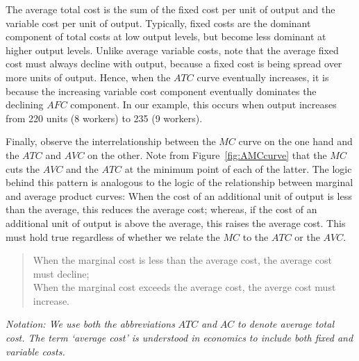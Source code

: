 \newhtmlpage

The average total cost is the sum of the fixed cost per unit of output and
the variable cost per unit of output. Typically, fixed costs are the
dominant component of total costs at low output levels, but become less
dominant at higher output levels. Unlike average variable costs, note that
the average fixed cost must always decline with output, because a fixed cost
is being spread over more units of output. Hence, when the $ATC$ curve
eventually increases, it is because the increasing variable cost component
eventually dominates the declining $AFC$ component. In our example, this
occurs when output increases from 220 units (8 workers) to 235 (9
workers).

Finally, observe the interrelationship between the $MC$ curve on the one
hand and the $ATC$ and $AVC$ on the other. Note from Figure~\ref{fig:AMCcurve}
that the $MC$ cuts the $AVC$ and the $ATC$ at the minimum
point of each of the latter. The logic behind this pattern is analogous to
the logic of the relationship between marginal and average product curves:
When the cost of an additional unit of output is less than the average, this
reduces the average cost; whereas, if the cost of an additional unit of
output is above the average, this raises the average cost. This must hold
true regardless of whether we relate the $MC$ to the $ATC$ or the $AVC$.

\begin{quote}
	When the marginal cost is less than the average cost, the average cost must decline; \\
	When the marginal cost exceeds the average cost, the averge cost must increase.
\end{quote}

\textit{Notation: We use both the abbreviations }$\mathit{ATC}$\textit{ and 
}$\mathit{AC}$\textit{ to denote average total cost. The term `average
cost' is understood in economics to include both fixed and variable costs.}
